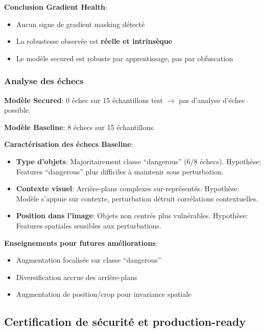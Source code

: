 \textbf{Conclusion Gradient Health}:

\begin{itemize}
    \item[\checkmark] Aucun signe de gradient masking détecté
    \item[\checkmark] La robustesse observée est \textbf{réelle et intrinsèque}
    \item[\checkmark] Le modèle secured est robuste par apprentissage, pas par obfuscation
\end{itemize}

\subsubsection{Analyse des échecs}

\textbf{Modèle Secured}: 0 échec sur 15 échantillons test $\rightarrow$ pas d'analyse d'échec possible.

\textbf{Modèle Baseline}: 8 échecs sur 15 échantillons.

\textbf{Caractérisation des échecs Baseline}:

\begin{itemize}
    \item \textbf{Type d'objets}: Majoritairement classe ``dangerous'' (6/8 échecs). Hypothèse: Features ``dangerous'' plus difficiles à maintenir sous perturbation.
    \item \textbf{Contexte visuel}: Arrière-plans complexes sur-représentés. Hypothèse: Modèle s'appuie sur contexte, perturbation détruit corrélations contextuelles.
    \item \textbf{Position dans l'image}: Objets non centrés plus vulnérables. Hypothèse: Features spatiales sensibles aux perturbations.
\end{itemize}

\textbf{Enseignements pour futures améliorations}:

\begin{itemize}
    \item Augmentation focalisée sur classe ``dangerous''
    \item Diversification accrue des arrière-plans
    \item Augmentation de position/crop pour invariance spatiale
\end{itemize}

\subsection{Certification de sécurité et production-ready}

